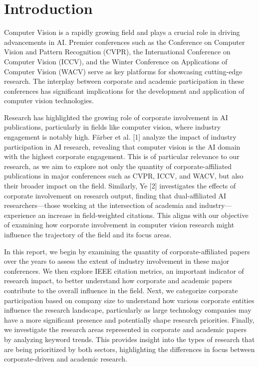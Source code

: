 \documentclass{article}
\begin{document}
\section{Introduction}
Computer Vision is a rapidly growing field and plays a crucial role in driving advancements in AI. Premier conferences such as the Conference on Computer Vision and Pattern Recognition (CVPR), the International Conference on Computer Vision (ICCV), and the Winter Conference on Applications of Computer Vision (WACV) serve as key platforms for showcasing cutting-edge research. The interplay between corporate and academic participation in these conferences has significant implications for the development and application of computer vision technologies. 

Research has highlighted the growing role of corporate involvement in AI publications, particularly in fields like computer vision, where industry engagement is notably high. Färber et al. [1] analyze the impact of industry participation in AI research, revealing that computer vision is the AI domain with the highest corporate engagement. This is of particular relevance to our research, as we aim to explore not only the quantity of corporate-affiliated publications in major conferences such as CVPR, ICCV, and WACV, but also their broader impact on the field. Similarly, Ye [2] investigates the effects of corporate involvement on research output, finding that dual-affiliated AI researchers—those working at the intersection of academia and industry—experience an increase in field-weighted citations. This aligns with our objective of examining how corporate involvement in computer vision research might influence the trajectory of the field and its focus areas.

In this report, we begin by examining the quantity of corporate-affiliated papers over the years to assess the extent of industry involvement in these major conferences. We then explore IEEE citation metrics, an important indicator of research impact, to better understand how corporate and academic papers contribute to the overall influence in the field. Next, we categorize corporate participation based on company size to understand how various corporate entities influence the research landscape, particularly as large technology companies may have a more significant presence and potentially shape research priorities. Finally, we investigate the research areas represented in corporate and academic papers by analyzing keyword trends. This provides insight into the types of research that are being prioritized by both sectors, highlighting the differences in focus between corporate-driven and academic research.
\end{document}
